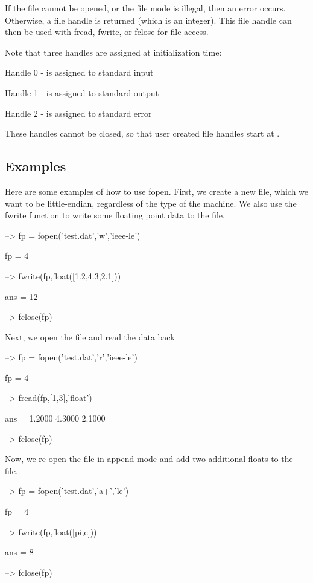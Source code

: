 If the file cannot be opened, or the file mode is illegal, then an error occurs. Otherwise, a file handle is returned (which is an integer). This file handle can then be used with {\ttfamily fread}, {\ttfamily fwrite}, or {\ttfamily fclose} for file access.

Note that three handles are assigned at initialization time\-: 
\begin{DoxyItemize}
\item Handle 0 -\/ is assigned to standard input  
\item Handle 1 -\/ is assigned to standard output  
\item Handle 2 -\/ is assigned to standard error  
\end{DoxyItemize}These handles cannot be closed, so that user created file handles start at {}.\hypertarget{variables_matrix_Examples}{}\subsection{Examples}\label{variables_matrix_Examples}
Here are some examples of how to use {\ttfamily fopen}. First, we create a new file, which we want to be little-\/endian, regardless of the type of the machine. We also use the {\ttfamily fwrite} function to write some floating point data to the file.


\begin{DoxyVerbInclude}
--> fp = fopen('test.dat','w','ieee-le')

fp = 
 4 

--> fwrite(fp,float([1.2,4.3,2.1]))

ans = 
 12 

--> fclose(fp)
\end{DoxyVerbInclude}


Next, we open the file and read the data back


\begin{DoxyVerbInclude}
--> fp = fopen('test.dat','r','ieee-le')

fp = 
 4 

--> fread(fp,[1,3],'float')

ans = 
    1.2000    4.3000    2.1000 

--> fclose(fp)
\end{DoxyVerbInclude}


Now, we re-\/open the file in append mode and add two additional {\ttfamily float}s to the file.


\begin{DoxyVerbInclude}
--> fp = fopen('test.dat','a+','le')

fp = 
 4 

--> fwrite(fp,float([pi,e]))

ans = 
 8 

--> fclose(fp)
\end{DoxyVerbInclude}


